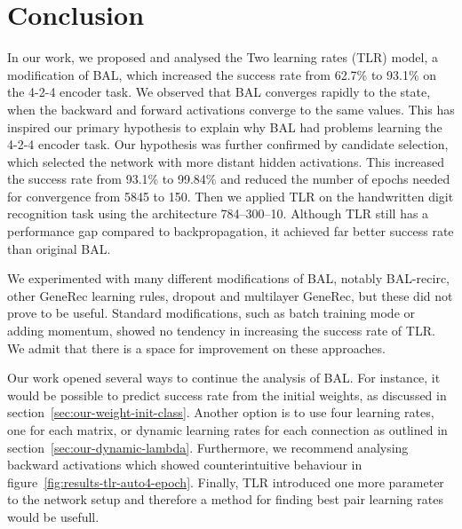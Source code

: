 
\section*{Conclusion}
\label{sec:conclusion} 

In our work, we proposed and analysed the Two learning rates (TLR) model, a modification of BAL, which increased the success rate from 62.7\% to 93.1\% on the 4-2-4 encoder task. We observed that BAL converges rapidly to the state, when the backward and forward activations converge to the same values. This has inspired our primary hypothesis to explain why BAL had problems learning the 4-2-4 encoder task. Our hypothesis was further confirmed by candidate selection, which selected the network with more distant hidden activations. This increased the success rate from 93.1\% to 99.84\% and reduced the number of epochs needed for convergence from 5845 to 150. Then we applied TLR on the handwritten digit recognition task using the architecture 784--300--10. Although TLR still has a performance gap compared to backpropagation, it achieved far better success rate than original BAL. %

We experimented with many different modifications of BAL, notably BAL-recirc, other GeneRec learning rules, dropout and multilayer GeneRec, but these did not prove to be useful. Standard modifications, such as batch training mode or adding momentum, showed no tendency in increasing the success rate of TLR. We admit that there is a space for improvement on these approaches.

\label{sec:future-work}
Our work opened several ways to continue the analysis of BAL. For instance, it would be possible to predict success rate from the initial weights, as discussed in section~\ref{sec:our-weight-init-class}. Another option is to use four learning rates, one for each matrix, or dynamic learning rates for each connection as outlined in section~\ref{sec:our-dynamic-lambda}. Furthermore, we recommend analysing backward activations which showed counterintuitive behaviour in figure~\ref{fig:results-tlr-auto4-epoch}. Finally, TLR introduced one more parameter to the network setup and therefore a method for finding best pair learning rates would be usefull. 


